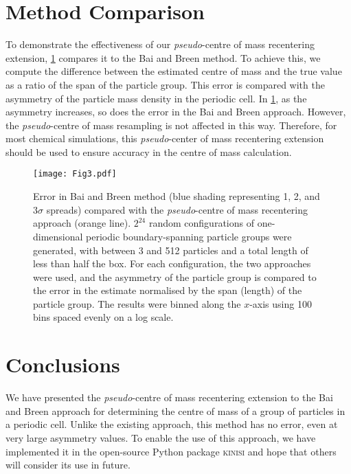 \documentclass[reprint,superscriptaddress,nobibnotes,amsmath,amssymb,aip]{revtex4-2}
\begin{document}
\section{Method Comparison}

To demonstrate the effectiveness of our \emph{pseudo}-centre of mass recentering extension, \cref{fig:method_comparison} compares it to the Bai and Breen method.
To achieve this, we compute the difference between the estimated centre of mass and the true value as a ratio of the span of the particle group. 
This error is compared with the asymmetry of the particle mass density in the periodic cell.\cite{xioajun_on_1991}
In \cref{fig:method_comparison}, as the asymmetry increases, so does the error in the Bai and Breen approach. 
However, the \emph{pseudo}-centre of mass resampling is not affected in this way. 
Therefore, for most chemical simulations, this \emph{pseudo}-center of mass recentering extension should be used to ensure accuracy in the centre of mass calculation. 
%
\begin{figure}
    \centering
    \texttt{[image: Fig3.pdf]}
    \caption{Error in Bai and Breen method (blue shading representing 1, 2, and 3$\sigma$ spreads) compared with the \emph{pseudo}-centre of mass recentering approach (orange line). 
    $2^{24}$ random configurations of one-dimensional periodic boundary-spanning particle groups were generated, with between 3 and 512 particles and a total length of less than half the box. 
    For each configuration, the two approaches were used, and the asymmetry of the particle group\cite{xioajun_on_1991} is compared to the error in the estimate normalised by the span (length) of the particle group. 
    The results were binned along the $x$-axis using 100 bins spaced evenly on a log scale.}
    \label{fig:method_comparison}
\end{figure}
%

\section{Conclusions}

We have presented the \emph{pseudo}-centre of mass recentering extension to the Bai and Breen approach for determining the centre of mass of a group of particles in a periodic cell. 
Unlike the existing approach, this method has no error, even at very large asymmetry values.
To enable the use of this approach, we have implemented it in the open-source Python package \textsc{kinisi}\cite{mccluskey_kinisi_2024} and hope that others will consider its use in future. 
\end{document}

